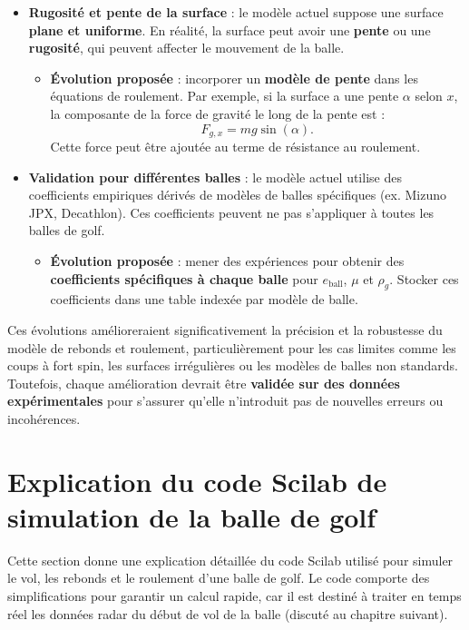 \documentclass[10pt,a4paper]{report}
\begin{document}
\begin{itemize}
    \item \textbf{Rugosité et pente de la surface} : le modèle actuel suppose une surface \textbf{plane et uniforme}. En réalité, la surface peut avoir une \textbf{pente} ou une \textbf{rugosité}, qui peuvent affecter le mouvement de la balle.
    \begin{itemize}
        \item \textbf{Évolution proposée} : incorporer un \textbf{modèle de pente} dans les équations de roulement. Par exemple, si la surface a une pente $\alpha$ selon $x$, la composante de la force de gravité le long de la pente est :
        \[
        F_{g,x} = m g \sin(\alpha).
        \]
        Cette force peut être ajoutée au terme de résistance au roulement.
    \end{itemize}

    \item \textbf{Validation pour différentes balles} : le modèle actuel utilise des coefficients empiriques dérivés de modèles de balles spécifiques (ex. Mizuno JPX, Decathlon). Ces coefficients peuvent ne pas s'appliquer à toutes les balles de golf.
    \begin{itemize}
        \item \textbf{Évolution proposée} : mener des expériences pour obtenir des \textbf{coefficients spécifiques à chaque balle} pour $e_{\text{ball}}$, $\mu$ et $\rho_g$. Stocker ces coefficients dans une table indexée par modèle de balle.
    \end{itemize}
\end{itemize}

Ces évolutions amélioreraient significativement la précision et la robustesse du modèle de rebonds et roulement, particulièrement pour les cas limites comme les coups à fort spin, les surfaces irrégulières ou les modèles de balles non standards. Toutefois, chaque amélioration devrait être \textbf{validée sur des données expérimentales} pour s'assurer qu'elle n'introduit pas de nouvelles erreurs ou incohérences.

\section{Explication du code Scilab de simulation de la balle de golf}
\label{sec:scilab_code}

Cette section donne une explication détaillée du code Scilab utilisé pour simuler le vol, les rebonds et le roulement d'une balle de golf. Le code comporte des simplifications pour garantir un calcul rapide, car il est destiné à traiter en temps réel les données radar du début de vol de la balle (discuté au chapitre suivant).
\end{document}
